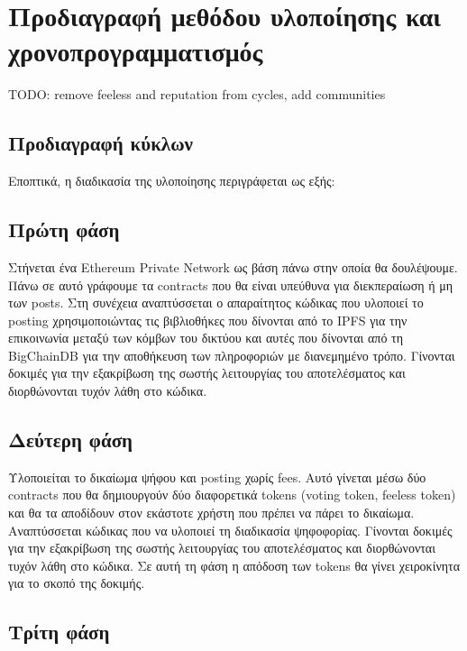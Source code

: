 \section{Προδιαγραφή μεθόδου υλοποίησης και χρονοπρογραμματισμός} \label{section:3-6-implementation-methodology-specification}

TODO: remove feeless and reputation from cycles, add communities

\subsection{Προδιαγραφή κύκλων}

Εποπτικά, η διαδικασία της υλοποίησης περιγράφεται ως εξής:


\subsection{Πρώτη φάση}

Στήνεται ένα Ethereum Private Network ως βάση πάνω στην οποία θα δουλέψουμε. Πάνω σε αυτό γράφουμε τα contracts που θα είναι υπεύθυνα για διεκπεραίωση ή μη των posts.
Στη συνέχεια αναπτύσσεται ο απαραίτητος κώδικας που υλοποιεί το posting χρησιμοποιώντας τις βιβλιοθήκες που δίνονται από το IPFS για την επικοινωνία μεταξύ των κόμβων του δικτύου και αυτές που δίνονται από τη BigChainDB για την αποθήκευση των πληροφοριών με διανεμημένο τρόπο.
Γίνονται δοκιμές για την εξακρίβωση της σωστής λειτουργίας του αποτελέσματος και διορθώνονται τυχόν λάθη στο κώδικα.

\subsection{Δεύτερη φάση}

Υλοποιείται το δικαίωμα ψήφου και posting χωρίς fees. Αυτό γίνεται μέσω δύο contracts που θα δημιουργούν δύο διαφορετικά tokens (voting token, feeless token) και θα τα αποδίδουν στον εκάστοτε χρήστη που πρέπει να πάρει το δικαίωμα.
Αναπτύσσεται κώδικας που να υλοποιεί τη διαδικασία ψηφοφορίας.
Γίνονται δοκιμές για την εξακρίβωση της σωστής λειτουργίας του αποτελέσματος και διορθώνονται τυχόν λάθη στο κώδικα. Σε αυτή τη φάση η απόδοση των tokens θα γίνει χειροκίνητα για το σκοπό της δοκιμής.

\subsection{Τρίτη φάση}

